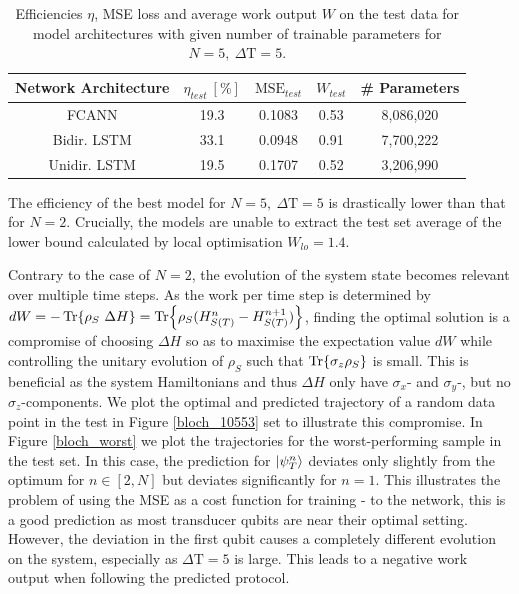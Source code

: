 \begin{table}[h]
	\centering
	\begin{tabular}{ c | c | c | c | c}
		Network Architecture & $\eta_{test} \ [\%]$ & $\mathrm{MSE}_{test}$ & $W_{test}$ & \# Parameters \\
		\hline
		FCANN        & 19.3 & 0.1083 & 0.53 & 8,086,020 \\
		Bidir. LSTM  & 33.1 & 0.0948 & 0.91 & 7,700,222 \\
		Unidir. LSTM & 19.5 & 0.1707 & 0.52 & 3,206,990\\
	\end{tabular}
	\caption{Efficiencies $\eta$, MSE loss and average work output $W$ on the test data for model architectures with given number of trainable parameters for $N=5, \ \Delta \mathrm{T} = 5$.}
	\label{n5efftable}
\end{table}

The efficiency of the best model for $N=5, \ \Delta \mathrm{T} = 5$ is drastically lower than that for $N=2$.
Crucially, the models are unable to extract the test set average of the lower bound calculated by local optimisation $W_{lo} = 1.4$.

Contrary to the case of $N=2$, the evolution of the system state becomes relevant over multiple time steps.
As the work per time step is determined by $dW = -\Tr{\rho_S \ \Delta H} = \Tr{\rho_S (H_{S(T)}^n - H_{S(T)}^{n+1})}$, finding the optimal solution is a compromise of choosing $\Delta H$ so as to maximise the expectation value $dW$ while controlling the unitary evolution of $\rho_S$ such that $\Tr{\sigma_z \rho_S}$ is small.
This is beneficial as the system Hamiltonians and thus $\Delta H$ only have $\sigma_x$- and $\sigma_y$-, but no $\sigma_z$-components.
We plot the optimal and predicted trajectory of a random data point in the test in Figure \ref{bloch_10553} set to illustrate this compromise.
In Figure \ref{bloch_worst} we plot the trajectories for the worst-performing sample in the test set.
In this case, the prediction for $\ket{\psi_T^n}$ deviates only slightly from the optimum for $n \in [2, N]$ but deviates significantly for $n=1$.
This illustrates the problem of using the MSE as a cost function for training - to the network, this is a good prediction as most transducer qubits are near their optimal setting.
However, the deviation in the first qubit causes a completely different evolution on the system, especially as $\Delta \mathrm{T} = 5$ is large.
This leads to a negative work output when following the predicted protocol.

